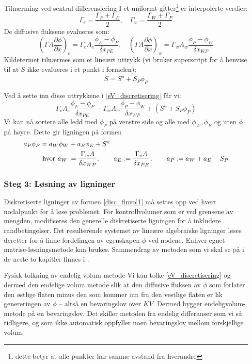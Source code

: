 \begin{oppsum}{Tilnærming ved sentral differensiering}
 I et uniformt gitter\footnote{dette betyr at alle punkter har samme avstand fra hverandre} er interpolerte verdier:
\[
\Gamma_e = \frac{\Gamma_P + \Gamma_E}{2}, \quad \Gamma_w = \frac{\Gamma_W + \Gamma_P}{2}
\]
De diffusive fluksene evalueres som:
\[
\left( \Gamma A \frac{\partial\phi}{\partial x} \right)_e = \Gamma_e A_e \frac{\phi_E - \phi_P}{\delta x_{PE}}, \quad
\left( \Gamma A \frac{\partial\phi}{\partial x} \right)_w = \Gamma_w A_w \frac{\phi_P - \phi_W}{\delta x_{WP}}
\]
Kildetermet tilnærmes som et lineært uttrykk (vi bruker superscript for å henvise til at $S$ ikke evalueres i et punkt i formelen):
\[
\tilde{S} = S^u + S_P \phi_P
\]
\end{oppsum}
Ved å sette inn disse uttrykkene i \eqref{eV_discretisering} får vi:
\[\Gamma_eA_e\frac{\phi_E-\phi_P}{\delta x_{PE}}- \Gamma_wA_w\frac{\phi_P-\phi_W}{\delta x_{WP}}+(S^u+S_P\phi_P)\]
Vi kan nå sortere alle ledd med $\phi_P$ på venstre side og alle med $\phi_W,\phi_E$ og uten $\phi$ på høyre. Dette gir ligningen på formen
\begin{align} \label{disc_finvol1}
a_P \phi_P &= a_W \phi_W + a_E \phi_E + S^u  \\
&\text{ hvor } a_W := \frac{\Gamma_w A}{\delta x_{WP}}, \qquad a_E := \frac{\Gamma_e A}{\delta x_{PE}}, \qquad
a_P := a_W + a_E - S_P \notag
\end{align}

\subsubsection*{Steg 3: Løsning av ligninger}

Diskretiserte ligninger av formen \eqref{disc_finvol1} må settes opp ved hvert nodalpunkt for å løse problemet. For kontrollvolumer som er ved grensene av mengden, modifiseres den generelle diskretiserte ligningen for å inkludere randbetingelser. Det resulterende systemet av lineære algebraiske ligninger løses deretter for å finne fordelingen av egenskapen $\phi$ ved nodene. Enhver egnet matrise-løsningsmetode kan brukes. Sammendrag av metoden som vi skal se på i de neste to kapitler finnes i .

\begin{oppsum}{Fysisk tolkning av endelig volum metode}
Vi kan tolke \eqref{eV_discretisering} og dermed den endelige volum metode slik at den diffusive fluksen av $\phi$ som forlater den østlige flaten minus den som kommer inn fra den vestlige flaten er lik genereringen av $\phi$ – altså en bevaringslov over $KV$.
Dermed bygger endeligvolum-metode på en bevaringslov. Det skiller metoden fra endelig differanser som vi så tidligere, og som ikke automatisk oppfyller noen bevaringslov mellom forskjellige volum.
\end{oppsum}
